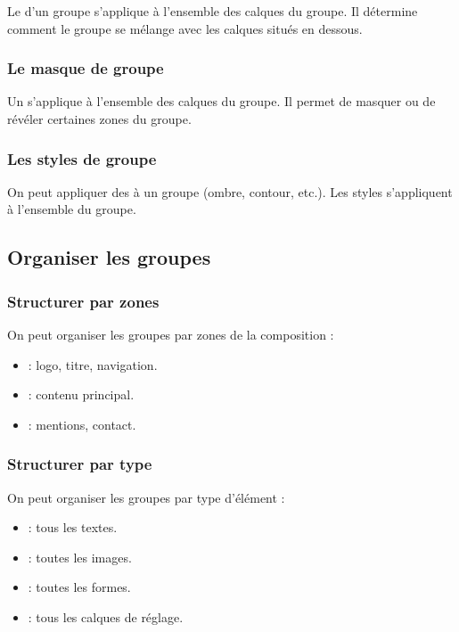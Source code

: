 Le  d'un groupe s'applique à l'ensemble des calques du groupe. Il détermine comment le groupe se mélange avec les calques situés en dessous.

\subsubsection{Le masque de groupe}

Un  s'applique à l'ensemble des calques du groupe. Il permet de masquer ou de révéler certaines zones du groupe.

\subsubsection{Les styles de groupe}

On peut appliquer des  à un groupe (ombre, contour, etc.). Les styles s'appliquent à l'ensemble du groupe.

\subsection{Organiser les groupes}

\subsubsection{Structurer par zones}

On peut organiser les groupes par zones de la composition :

\begin{itemize}
    \item {} : logo, titre, navigation.
    \item {} : contenu principal.
    \item {} : mentions, contact.
\end{itemize}

\subsubsection{Structurer par type}

On peut organiser les groupes par type d'élément :

\begin{itemize}
    \item {} : tous les textes.
    \item {} : toutes les images.
    \item {} : toutes les formes.
    \item {} : tous les calques de réglage.
\end{itemize}

